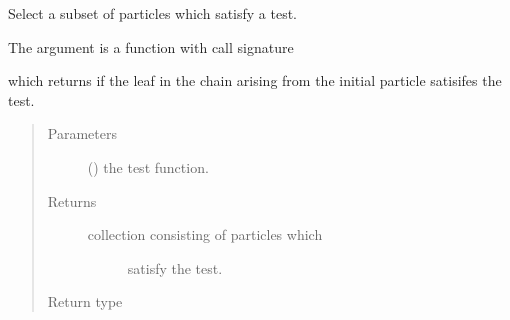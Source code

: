 \documentclass[letterpaper,10pt,english]{sphinxmanual}
\begin{document}
\begin{fulllineitems}
\begin{fulllineitems}
\begin{quote}
\begin{description}
\end{description}\end{quote}

\end{fulllineitems}


\begin{fulllineitems}
\label{\detokenize{code_structure:scdc.particle.ParticleCollection.select}}
Select a subset of particles which satisfy a test.

The argument  is a function with call signature
\begin{quote}

\end{quote}

which returns  if the leaf  in the chain arising from
the initial particle  satisifes the test.
\begin{quote}\begin{description}
\item[{Parameters}] \leavevmode
{} () \textendash{} the test function.

\item[{Returns}] \leavevmode
\begin{description}
\item[{collection consisting of particles which}] \leavevmode
satisfy the test.

\end{description}


\item[{Return type}] \leavevmode
{\hyperref[\detokenize{code_structure:scdc.particle.ParticleCollection}]{}}

\end{description}\end{quote}

\end{fulllineitems}



\end{fulllineitems}
\end{document}
